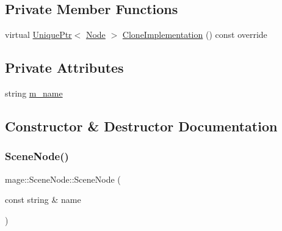\subsection*{Private Member Functions}
\begin{DoxyCompactItemize}
\item 
virtual \hyperlink{namespacemage_a8c307fbcc33bce9b7f2aa4c26c3b95cf}{Unique\+Ptr}$<$ \hyperlink{classmage_1_1_node}{Node} $>$ \hyperlink{classmage_1_1_scene_node_a42d0d53ab804d38ebd584d2de6490eeb}{Clone\+Implementation} () const override
\end{DoxyCompactItemize}
\subsection*{Private Attributes}
\begin{DoxyCompactItemize}
\item 
string \hyperlink{classmage_1_1_scene_node_a3ba13ec190df3e020c89d2ace0301dec}{m\+\_\+name}
\end{DoxyCompactItemize}


\subsection{Constructor \& Destructor Documentation}
\hypertarget{classmage_1_1_scene_node_afc138707692a66952484ae2b3c6e15d5}{}\label{classmage_1_1_scene_node_afc138707692a66952484ae2b3c6e15d5} 
\subsubsection{\texorpdfstring{Scene\+Node()}{SceneNode()}\hspace{0.1cm}{\footnotesize\ttfamily [1/3]}}
{\footnotesize\ttfamily mage\+::\+Scene\+Node\+::\+Scene\+Node (\begin{DoxyParamCaption}\item[{const string \&}]{name }\end{DoxyParamCaption})\hspace{0.3cm}{\ttfamily [explicit]}}

\hypertarget{classmage_1_1_scene_node_a0259a6b573eb633b589cd986b9ec6734}{}\label{classmage_1_1_scene_node_a0259a6b573eb633b589cd986b9ec6734} 
